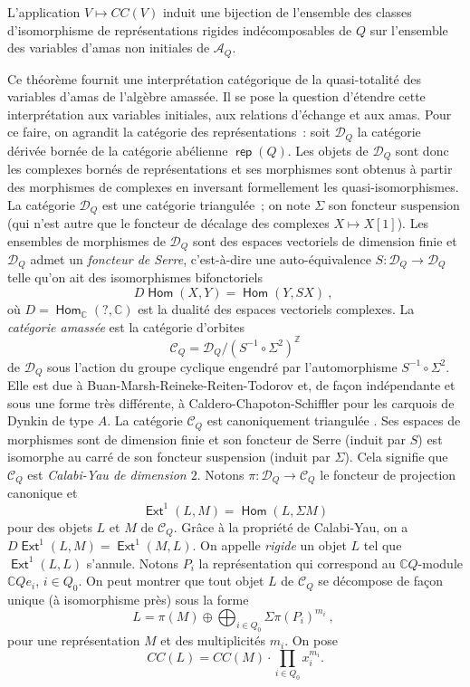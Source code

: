 \documentclass[brochure,12pt]{bourbaki}
\newcommand{\ko}{\: , \;}
\numberwithin{equation}{subsection}
\numberwithin{theorem}{section}
\newcommand{\opname}[1]{\operatorname{\mathsf{#1}}}
\newcommand{\rep}{\opname{rep}\nolimits}
\renewcommand{\rep}{\opname{rep}\nolimits}
\newcommand{\Z}{\mathbb{Z}}
\newcommand{\C}{\mathbb{C}}
\newcommand{\Hom}{\opname{Hom}}
\newcommand{\Ext}{\opname{Ext}}
\newcommand{\ca}{{\mathcal A}}
\newcommand{\cc}{{\mathcal C}}
\newcommand{\cd}{{\mathcal D}}
\begin{document}
\begin{theo} L'application $V \mapsto CC(V)$ induit une bijection de
l'ensemble des classes d'isomorphisme de repr\'esentations rigides
ind\'ecomposables de $Q$ sur l'ensemble des variables d'amas non initiales
de $\ca_Q$.
\end{theo}

Ce th\'eor\`eme fournit une interpr\'etation cat\'egorique de la
quasi-totalit\'e des variables d'amas de l'alg\`ebre
amass\'ee. Il se pose la question d'\'etendre cette interpr\'etation
aux variables initiales, aux relations d'\'echange et aux amas.
Pour ce faire, on agrandit la cat\'egorie des repr\'esentations~: soit $\cd_Q$ la
cat\'egorie d\'eriv\'ee born\'ee de la cat\'egorie ab\'elienne
$\rep(Q)$. Les objets de $\cd_Q$ sont donc les complexes born\'es de
repr\'esentations et ses morphismes sont obtenus \`a partir des
morphismes de complexes en inversant formellement les
quasi-isomorphismes. La cat\'egorie $\cd_Q$ est une cat\'egorie
triangul\'ee~; on note $\Sigma$ son foncteur suspension (qui n'est
autre que le foncteur de d\'ecalage des complexes $X\mapsto X[1]$).
Les ensembles de morphismes de $\cd_Q$ sont des espaces vectoriels de
dimension finie et $\cd_Q$ admet un {\em foncteur de Serre},
c'est-\`a-dire une auto-\'equivalence $S:\cd_Q \to \cd_Q$ telle qu'on
ait des isomorphismes bifonctoriels
\[
D\Hom(X,Y) = \Hom(Y,SX) \ko
\]
o\`u $D=\Hom_\C(?,\C)$ est la dualit\'e des espaces vectoriels complexes.
La {\em cat\'egorie amass\'ee} est la cat\'egorie d'orbites
\[
\cc_Q = \cd_Q/ (S^{-1} \circ \Sigma^2)^\Z
\]
de $\cd_Q$ sous l'action du groupe cyclique engendr\'e par l'automorphisme
$S^{-1}\circ \Sigma^2$. Elle est due \`a Buan-Marsh-Reineke-Reiten-Todorov
\cite{BuanMarshReinekeReitenTodorov06} et, de fa\c{c}on ind\'ependante
et sous une forme tr\`es diff\'erente, \`a
Caldero-Chapoton-Schiffler \cite{CalderoChapotonSchiffler06} pour
les carquois de Dynkin de type $A$.
La cat\'egorie $\cc_Q$ est canoniquement triangul\'ee \cite{Keller05}.
Ses espaces de morphismes sont de dimension finie et son foncteur
de Serre (induit par $S$) est isomorphe au carr\'e de son foncteur
suspension (induit par $\Sigma$). Cela signifie que $\cc_Q$
est {\em Calabi-Yau de dimension $2$}. Notons $\pi: \cd_Q \to \cc_Q$
le foncteur de projection canonique et
\[
\Ext^1(L,M)=\Hom(L,\Sigma M)
\]
pour des objets $L$ et $M$ de $\cc_Q$. Gr\^ace \`a la propri\'et\'e
de Calabi-Yau, on a $D\Ext^1(L,M)=\Ext^1(M,L)$. On appelle
{\em rigide} un objet $L$ tel que $\Ext^1(L,L)$ s'annule. Notons $P_i$ la
repr\'esentation qui correspond au $\C Q$-module $\C Q e_i$, $i\in Q_0$.
On peut montrer \cite{BuanMarshReinekeReitenTodorov06} que tout objet
$L$ de $\cc_Q$ se d\'ecompose de fa\c{c}on unique (\`a isomorphisme pr\`es)
sous la forme
\[
L=\pi(M) \oplus \bigoplus_{i\in Q_0} \Sigma \pi(P_i)^{m_i} \ko
\]
pour une repr\'esentation $M$ et des multiplicit\'es $m_i$. On pose
\[
CC(L) = CC(M) \cdot \prod_{i\in Q_0} x_i^{m_i}.
\]
\end{document}
